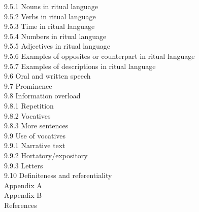 \documentclass[10pt]{article}
\begin{document}
9.5.1 Nouns in ritual language\\
9.5.2 Verbs in ritual language\\
9.5.3 Time in ritual language\\
9.5.4 Numbers in ritual language\\
9.5.5 Adjectives in ritual language\\
9.5.6 Examples of opposites or counterpart in ritual language\\
9.5.7 Examples of descriptions in ritual language\\
9.6 Oral and written speech\\
9.7 Prominence\\
9.8 Information overload\\
9.8.1 Repetition\\
9.8.2 Vocatives\\
9.8.3 More sentences\\
9.9 Use of vocatives\\
9.9.1 Narrative text\\
9.9.2 Hortatory/expository\\
9.9.3 Letters\\
9.10 Definiteness and referentiality\\
Appendix A\\
Appendix B\\
References
\end{document}
